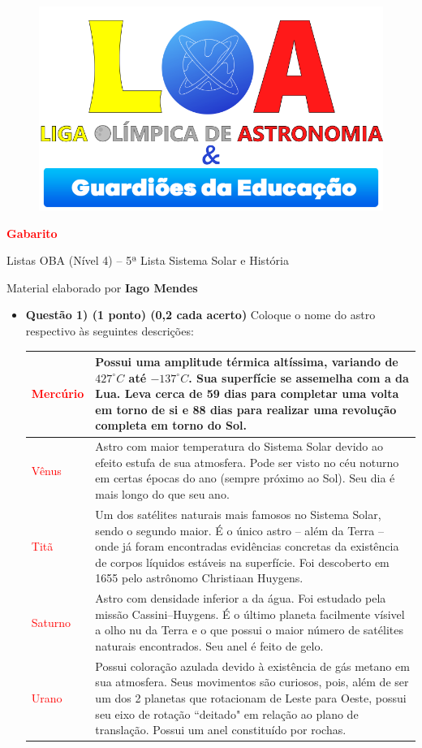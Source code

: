 \documentclass[a4paper, 12pt]{article}
\newcommand{\red}[1]{\textcolor{red}{#1}}
\newcommand{\cabecalho}[4]
{
	\begin{figure}
		\centering
		\href{https://ligaolimpicadeastronomia.com.br/}{\includegraphics[scale=0.6]{./img/logos.png}}
	\end{figure}
	
	\begin{center}
		\begin{large}
			\textbf{#1}	
		\end{large}
			\linebreak Listas OBA (Nível 4) -- #2ª Lista
			\linebreak #3
		\end{center}
	
	\begin{flushright}
		Material elaborado por \textbf{#4}
	\end{flushright}
}
\begin{document}
	\cabecalho{\red{Gabarito}}{5}{Sistema Solar e História}{Iago Mendes}
	
	\begin{flushleft}
	\begin{itemize}
		\item \textbf{Questão 1) (1 ponto) (0,2 cada acerto)} Coloque o nome do astro respectivo às seguintes descrições:
			\begin{center} \begin{tabular}{|M{0.2\textwidth}|M{0.65\textwidth}|}
				\hline
				\red{Mercúrio} & Possui uma amplitude térmica altíssima, variando de $427^{\circ}C$ até $-137^{\circ}C$. Sua superfície se assemelha com a da Lua. Leva cerca de 59 dias para completar uma volta em torno de si e 88 dias para realizar uma revolução completa em torno do Sol. \\ \hline
				\red{Vênus} & Astro com maior temperatura do Sistema Solar devido ao efeito estufa de sua atmosfera. Pode ser visto no céu noturno em certas épocas do ano (sempre próximo ao Sol). Seu dia é mais longo do que seu ano. \\ \hline
				\red{Titã} & Um dos satélites naturais mais famosos no Sistema Solar, sendo o segundo maior. É o único astro -- além da Terra -- onde já foram encontradas evidências concretas da existência de corpos líquidos estáveis na superfície. Foi descoberto em 1655 pelo astrônomo Christiaan Huygens. \\ \hline
				\red{Saturno} & Astro com densidade inferior a da água. Foi estudado pela missão Cassini–Huygens. É o último planeta facilmente vísivel a olho nu da Terra e o que possui o maior número de satélites naturais encontrados. Seu anel é feito de gelo. \\ \hline
				\red{Urano} & Possui coloração azulada devido à existência de gás metano em sua atmosfera. Seus movimentos são curiosos, pois, além de ser um dos 2 planetas que rotacionam de Leste para Oeste, possui seu eixo de rotação ``deitado" em relação ao plano de translação. Possui um anel constituído por rochas.\\ \hline
			\end{tabular} \end{center}


\end{itemize}
\end{flushleft}
\end{document}

